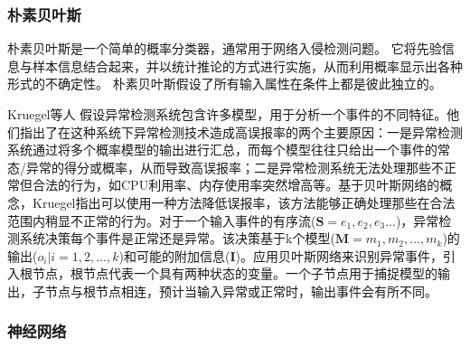 


\subsubsection{朴素贝叶斯}

朴素贝叶斯是一个简单的概率分类器，通常用于网络入侵检测问题。 它将先验信息与样本信息结合起来，并以统计推论的方式进行实施，从而利用概率显示出各种形式的不确定性。 朴素贝叶斯假设了所有输入属性在条件上都是彼此独立的。

Kruegel等人\cite{kruegel2003bayesian} 假设异常检测系统包含许多模型，用于分析一个事件的不同特征。他们指出了在这种系统下异常检测技术造成高误报率的两个主要原因：一是异常检测系统通过将多个概率模型的输出进行汇总，而每个模型往往只给出一个事件的常态/异常的得分或概率，从而导致高误报率；二是异常检测系统无法处理那些不正常但合法的行为，如CPU利用率、内存使用率突然增高等。基于贝叶斯网络的概念，Kruegel\citep{kruegel2003bayesian}指出可以使用一种方法降低误报率，该方法能够正确处理那些在合法范围内稍显不正常的行为。对于一个输入事件的有序流($\symbf{S}=e_1,e_2,e_3...$)，异常检测系统决策每个事件是正常还是异常。该决策基于k个模型($\symbf{M}=m_1,m_2,...,m_k$)的输出($o_i|i=1,2,...,k$)和可能的附加信息($\symbf{I}$)。应用贝叶斯网络来识别异常事件，引入根节点，根节点代表一个具有两种状态的变量。一个子节点用于捕捉模型的输出，子节点与根节点相连，预计当输入异常或正常时，输出事件会有所不同。

\subsubsection{神经网络}

